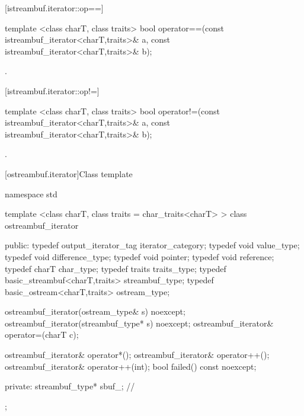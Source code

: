 [istreambuf.iterator::op==]{}

%
\begin{itemdecl}
template <class charT, class traits>
  bool operator==(const istreambuf_iterator<charT,traits>& a,
                  const istreambuf_iterator<charT,traits>& b);
\end{itemdecl}

\begin{itemdescr}
\pnum
\returns
{}.
\end{itemdescr}

[istreambuf.iterator::op!=]{}

%
\begin{itemdecl}
template <class charT, class traits>
  bool operator!=(const istreambuf_iterator<charT,traits>& a,
                  const istreambuf_iterator<charT,traits>& b);
\end{itemdecl}

\begin{itemdescr}
\pnum
\returns
{}.
\end{itemdescr}

[ostreambuf.iterator]{Class template }

%
\begin{codeblock}
namespace std {
  template <class charT, class traits = char_traits<charT> >
  class ostreambuf_iterator {
  public:
    typedef output_iterator_tag           iterator_category;
    typedef void                          value_type;
    typedef void                          difference_type;
    typedef void                          pointer;
    typedef void                          reference;
    typedef charT                         char_type;
    typedef traits                        traits_type;
    typedef basic_streambuf<charT,traits> streambuf_type;
    typedef basic_ostream<charT,traits>   ostream_type;

    ostreambuf_iterator(ostream_type& s) noexcept;
    ostreambuf_iterator(streambuf_type* s) noexcept;
    ostreambuf_iterator& operator=(charT c);

    ostreambuf_iterator& operator*();
    ostreambuf_iterator& operator++();
    ostreambuf_iterator& operator++(int);
    bool failed() const noexcept;

  private:
    streambuf_type* sbuf_;                // \expos
  };
}
\end{codeblock}

